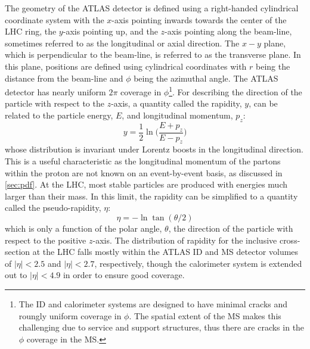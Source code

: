 The geometry of the ATLAS detector is defined using a 
right-handed cylindrical coordinate system with the $x$-axis
pointing inwards towards the center of the LHC ring, the $y$-axis pointing
up, and the $z$-axis pointing along the beam-line, sometimes referred
to as the longitudinal or axial direction.
The $x-y$ plane, which is perpendicular to the beam-line,
is referred to as the transverse plane. In this plane, positions are  
defined using cylindrical coordinates with $r$ being the distance
from the beam-line and $\phi$ being the azimuthal angle.
The ATLAS detector has nearly uniform $2\pi$ 
coverage in $\phi$\footnote{The ID and calorimeter systems are designed
to have minimal cracks and roungly uniform coverage in $\phi$. The
spatial extent of the MS makes this challenging due to service
and support structures, thus there are cracks in the $\phi$ coverage in the MS.}.
For describing the direction of the particle with respect 
to the $z$-axis, a quantity called the rapidity, $y$,
can be related to the particle energy, $E$, and longitudinal momentum, $p_z$:
\begin{equation}
y = \frac{1}{2} \ln \Bigg(\frac{E+p_z}{E-p_z} \Bigg)
\end{equation}
whose distribution is invariant under Lorentz boosts in the longitudinal direction.
This is a useful characteristic as the longitudinal momentum of the
partons within the proton are not known on an 
event-by-event basis, as discussed in \sec\ref{sec:pdf}.
At the LHC, most stable particles 
are produced with energies much larger than their mass.
In this limit, 
the rapidity can be simplified to a quantity called the pseudo-rapidity, $\eta$:
\begin{equation}
\eta = -\ln \tan (\theta/2) 
\label{eq:pseudorapidity}
\end{equation}
which is only a function of the polar angle, $\theta$, 
the direction of the particle with respect to the positive $z$-axis.
The distribution of rapidity for the inclusive cross-section
at the LHC falls mostly within the ATLAS ID and MS detector volumes 
of $|\eta| < 2.5$ and $|\eta| < 2.7$, respectively, 
though the calorimeter system is extended out to $|\eta| < 4.9$
in order to ensure good coverage.

